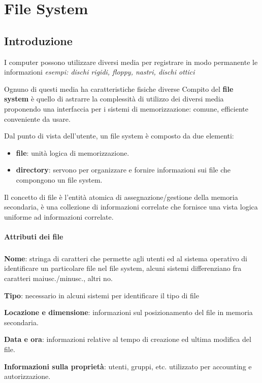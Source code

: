 \chapter{File System}
\newpage
\section{Introduzione}
I computer possono utilizzare diversi media per registrare in
modo permanente le informazioni
\textit{esempi: dischi rigidi, floppy, nastri, dischi ottici}

Ognuno di questi media ha caratteristiche fisiche diverse
Compito del \textbf{file system} è quello di astrarre la complessità di utilizzo dei diversi media proponendo una interfaccia per i sistemi di memorizzazione: comune, efficiente
conveniente da usare.

Dal punto di vista dell’utente, un file system è composto da
due elementi:
\begin{itemize}
    \item \textbf{file}: unità logica di memorizzazione.
    \item \textbf{directory}: servono per organizzare e fornire informazioni sui file che compongono un file system.
\end{itemize}

Il concetto di file è l'entità atomica di assegnazione/gestione della memoria secondaria,  è una collezione di informazioni correlate che fornisce una vista logica uniforme ad informazioni correlate.

\subsubsection{Attributi dei file}
\paragraph{}
\textbf{Nome}: stringa di caratteri che permette agli utenti ed al sistema operativo di identificare un particolare file nel file system, alcuni sistemi differenziano fra caratteri maiusc./minusc., altri no.

\textbf{Tipo}: necessario in alcuni sistemi per identificare il tipo di file

\textbf{Locazione e dimensione}: informazioni sul posizionamento del file in memoria secondaria.

\textbf{Data e ora}: informazioni relative al tempo di creazione ed ultima modifica del file.

\textbf{Informazioni sulla proprietà}: utenti, gruppi, etc. utilizzato per accounting e autorizzazione.

